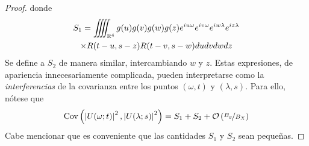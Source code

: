 \begin{proof}
donde
\begin{multline*}
S_1 = \iiiint_{\mathbb{R}^{4}} g(u) g(v) g(w) g(z) e^{i u \omega} e^{i v \omega} e^{i w \lambda} e^{i z \lambda} \\
\times
R(t-u,s-z)R(t-v,s-w)
du dv dw dz 
\end{multline*}
Se define a $S_2$ de manera similar, intercambiando $w$ y $z$. 
%
Estas expresiones, de apariencia innecesariamente complicada, pueden interpretarse como la \textit{interferencias} de la covarianza entre los puntos $(\omega, t)$ y $(\lambda,s)$.
%
Para ello, nótese que
\begin{equation}
\mathrm{Cov}\left( \left| U(\omega;t) \right|^{2},\left| U(\lambda;s) \right|^{2} \right) = S_1 + S_2 + \mathcal{O}\left( \nicefrac{B_g}{B_X} \right)
\end{equation}
%
Cabe mencionar que es conveniente que las cantidades $S_1$ y $S_2$ sean pequeñas.


\end{proof}
